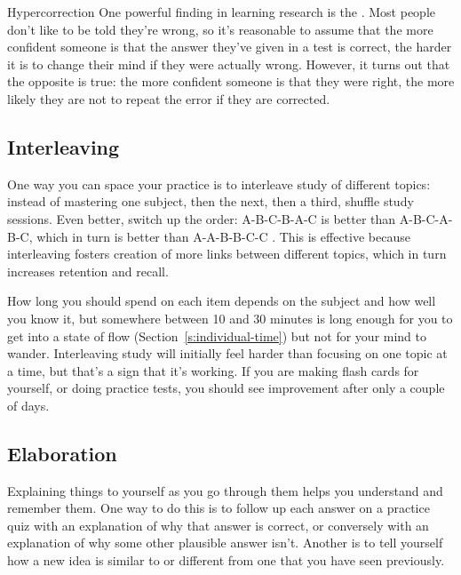 \begin{aside}{Hypercorrection}
  One powerful finding in learning research is the  \cite{Metc2016}. Most people don't
  like to be told they're wrong, so it's reasonable to assume that the
  more confident someone is that the answer they've given in a test is
  correct, the harder it is to change their mind if they were actually
  wrong. However, it turns out that the opposite is true: the more
  confident someone is that they were right, the more likely they are
  not to repeat the error if they are corrected.
\end{aside}

\subsection*{Interleaving}

One way you can space your practice is to interleave study of different
topics: instead of mastering one subject, then the next, then a third,
shuffle study sessions. Even better, switch up the order: A-B-C-B-A-C is
better than A-B-C-A-B-C, which in turn is better than A-A-B-B-C-C
\cite{Rohrer2015}. This is effective because interleaving fosters
creation of more links between different topics, which in turn increases
retention and recall.

How long you should spend on each item depends on the subject and how
well you know it, but somewhere between 10 and 30 minutes is long enough
for you to get into a state of flow (Section~\ref{s:individual-time}) but
not for your mind to wander. Interleaving study will initially feel
harder than focusing on one topic at a time, but that's a sign that it's
working. If you are making flash cards for yourself, or doing practice
tests, you should see improvement after only a couple of days.

\subsection*{Elaboration}

Explaining things to yourself as you go through them helps you
understand and remember them. One way to do this is to follow up each
answer on a practice quiz with an explanation of why that answer is
correct, or conversely with an explanation of why some other plausible
answer isn't. Another is to tell yourself how a new idea is similar to
or different from one that you have seen previously.

